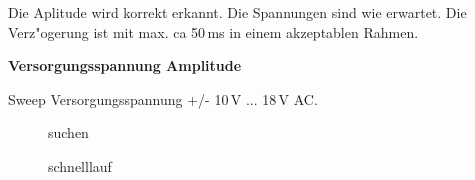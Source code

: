 \documentclass[ngerman,11pt,parskip=half] {scrartcl}
\newcommand {\tscopesize}{12cm}
\begin{document}
Die Aplitude wird korrekt erkannt. Die Spannungen sind wie erwartet. Die Verz"ogerung ist mit max. ca 50\,ms in einem akzeptablen Rahmen.

\textbf{Versorgungsspannung Amplitude}

Sweep Versorgungsspannung +/- 10\,V ... 18\,V AC. 

\begin{figure}[H]
\centering
{}
\caption{suchen} \label{fig:1}
\end{figure}

\begin{figure}[H]
\centering
{}
\caption{schnelllauf} \label{fig:1}
\end{figure}
\end{document}
